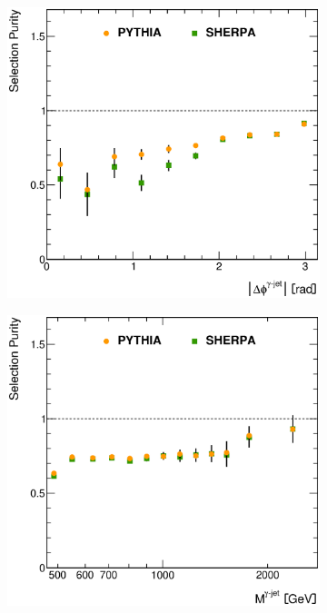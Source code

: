 \documentclass[12pt, twoside]{article}
\numberwithin{equation}{section}
\numberwithin{figure}{section}
\newenvironment{changemargin}[2]{%
\begin{list}{}{%
\setlength{\topsep}{0pt}%
\setlength{\leftmargin}{#1}%
\setlength{\rightmargin}{#2}%
\setlength{\listparindent}{\parindent}%
\setlength{\itemindent}{\parindent}%
\setlength{\parsep}{\parskip}%
}%
\item[]}{\end{list}}
\begin{document}
\begin{figure}
\begin{changemargin}{-1.0cm}{-0.75cm}
\begin{changemargin}{-0.75cm}{-1.0cm}
        \vspace{0.2cm}
        \begin{subfigure}[b]{0.37\textwidth}
            \includegraphics[width=\textwidth]{./images/SelectionPurities/PUR-107.eps}
            \subcaption{}
            \label{fig:SelectionPuritiesPhiPhotonJet}
        \end{subfigure}
        \begin{subfigure}[b]{0.37\textwidth}
            \includegraphics[width=\textwidth]{./images/SelectionPurities/PUR-108.eps}

\end{subfigure}
\end{changemargin}
\end{changemargin}
\end{figure}
\end{document}
